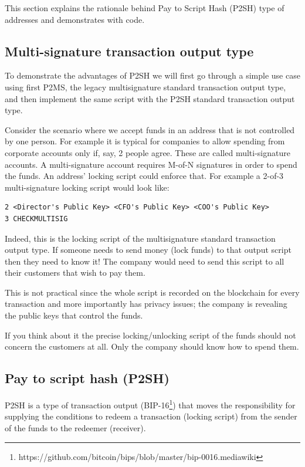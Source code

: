 This section explains the rationale behind Pay to Script Hash (P2SH) type of addresses and demonstrates with code.

\subsection*{Multi-signature transaction output type}
To demonstrate the advantages of P2SH we will first go through a simple use case using first P2MS, the legacy multisignature standard transaction output type, and then implement the same script with the P2SH standard transaction output type.

Consider the scenario where we accept funds in an address that is not controlled by one person. For example it is typical for companies to allow spending from corporate accounts only if, say, 2 people agree. These are called multi-signature accounts. A multi-signature account requires M-of-N signatures in order to spend the funds. An address’ locking script could enforce that. For example a 2-of-3 multi-signature locking script would look like:

\begin{emphbox}
\begin{lstlisting}[style=Pseudomath]
2 <Director's Public Key> <CFO's Public Key> <COO's Public Key> 
3 CHECKMULTISIG
\end{lstlisting}
\end{emphbox}

Indeed, this is the locking script of the multisignature standard transaction output type. If someone needs to send money (lock funds) to that output script then they need to know it! The company would need to send this script to all their customers that wish to pay them.

This is not practical since the whole script is recorded on the blockchain for every transaction and more importantly has privacy issues; the company is revealing the public keys that control the funds.

If you think about it the precise locking/unlocking script of the funds should not concern the customers at all. Only the company should know how to spend them.


\subsection*{Pay to script hash (P2SH)}
P2SH is a type of transaction output (BIP-16\footnote{https://github.com/bitcoin/bips/blob/master/bip-0016.mediawiki}) that moves the responsibility for supplying the conditions to redeem a transaction (locking script) from the sender of the funds to the redeemer (receiver).

